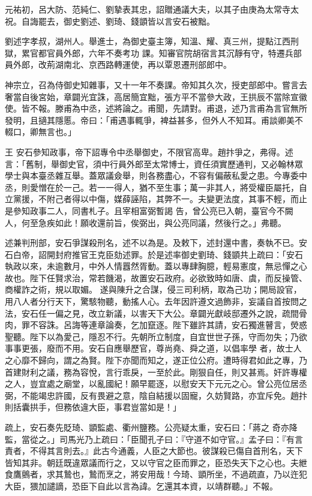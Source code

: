 \begin{pinyinscope}
 元祐初，呂大防、范純仁、劉摯表其忠，詔贈通議大夫，以其子由庚為太常寺太祝。自誨罷去，御史劉述、劉琦、錢顗皆以言安石被黜。



 劉述字孝叔，湖州人。舉進士，為御史臺主簿，知溫、耀、真三州，提點江西刑獄，累官都官員外郎，六年不奏考功
 課。知審官院胡宿言其沉靜有守，特遷兵部員外郎，改荊湖南北、京西路轉運使，再以覃恩遷刑部郎中。



 神宗立，召為侍御史知雜事，又十一年不奏課。帝知其久次，授吏部郎中。嘗言去奢當自後宮始，章闢光宜誅，高居簡宜黜，張方平不當參大政，王拱辰不當除宣徽使。皆不報。滕甫為中丞，述將論之。甫聞，先請對。甫退，述乃言甫為言官無所發明，且擿其隱慝。帝曰：「甫遇事輒爭，裨益甚多，但外人不知耳。甫談卿美不輟口，卿無言也。」



 王
 安石參知政事，帝下詔專令中丞舉御史，不限官高卑。趙抃爭之，弗得。述言：「舊制，舉御史官，須中行員外郎至太常博士，資任須實歷通判，又必翰林眾學士與本臺丞雜互舉。蓋眾議僉舉，則各務盡心，不容有偏蔽私愛之患。今專委中丞，則愛憎在於一己。若一一得人，猶不至生事；萬一非其人，將受權臣屬托，自立黨援，不附己者得以中傷，媒薛誣陷，其弊不一。夫變更法度，其事不輕，而止是參知政事二人，同書札子。且宰相富弼暫謁
 告，曾公亮已入朝，臺官今不闕人，何至急疾如此！願收還前旨，俟弼出，與公亮同議，然後行之。」弗聽。



 述兼判刑部，安石爭謀殺刑名，述不以為是。及敕下，述封還中書，奏執不已。安石白帝，詔開封府推官王克臣劾述罪。於是述率御史劉琦、錢顗共上疏曰：「安石執政以來，未逾數月，中外人情囂然胥動。蓋以專肆胸臆，輕易憲度，無忌憚之心故也。陛下任賢求治，常若饑渴，故置安石政府。必欲致時如唐、虞，而反操管、商權詐之術，規以取媚。
 遂與陳升之合謀，侵三司利柄，取為己功；開局設官，用八人者分行天下，驚駭物聽，動搖人心。去年因許遵文過飾非，妄議自首按問之法，安石任一偏之見，改立新議，以害天下大公。章闢光獻岐邸遷外之說，疏間骨肉，罪不容誅。呂誨等連章論奏，乞加竄逐。陛下雖許其請，安石獨進瞽言，熒惑聖聽。陛下以為愛己，隱忍不行。先朝所立制度，自宜世世子孫，守而勿失；乃欲事事更張，廢而不用。安石自應舉歷官，尊尚堯、舜之道，以倡率學
 者，故士人之心靡不歸向，謂之為賢。陛下亦聞而知之，遂正位公府。遭時得君如此之專，乃首建財利之議，務為容悅，言行乖戾，一至於此。剛狠自任，則又甚焉。奸許專權之人，豈宜處之廟堂，以亂國紀！願早罷逐，以慰安天下元元之心。曾公亮位居丞弼，不能竭忠許國，反有畏避之意，陰自結援以固寵，久妨賢路，亦宜斥免。趙抃則括囊拱手，但務依違大臣，事君豈當如是！」



 疏上，安石奏先貶琦、顗監處、衢州鹽務。公亮疑太重，安石曰：「蔣之
 奇亦降監，當從之。」司馬光乃上疏曰：「臣聞孔子曰：『守道不如守官。』孟子曰：『有言責者，不得其言則去。』此古今通義，人臣之大節也。彼謀殺已傷自首刑名，天下皆知其非。朝廷既違眾議而行之，又以守官之臣而罪之，臣恐失天下之心也。夫紲食鷹鸇者，求其鷙也，鷙而烹之，將安用哉！今琦、顗所坐，不過疏直，乃以迕犯大臣，猥加譴謫，恐臣下自此以言為諱。乞還其本資，以靖群聽。」不報。




\end{pinyinscope}
